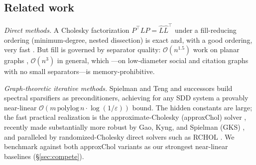 \documentclass[leqno,letterpaper]{etna}
\begin{document}
\subsection{Related work}\label{sec:related}
\emph{Direct methods.} A Cholesky factorization $P^{\top}LP=\hat L\hat L^{\top}$ under a
fill-reducing ordering (minimum-degree, nested dissection) is exact and, with a good
ordering, very fast \cite{davis-cholmod,george-nd}. But fill is governed by separator
quality: $\mathcal{O}(n^{1.5})$ work on planar graphs \cite{lipton-rose-tarjan},
$\mathcal{O}(n^3)$ in general, which ---on low-diameter social and citation graphs with no
small separators---is memory-prohibitive.

\emph{Graph-theoretic iterative methods.} Spielman and Teng \cite{spielman-teng} and
successors \cite{kelner-stoc} build spectral sparsifiers as preconditioners, achieving
for any SDD system a provably near-linear $\mathcal{O}(m\,\mathrm{polylog}\,n\cdot\log(1/\varepsilon))$ bound. The hidden constants are large; the fast practical realization is the
approximate-Cholesky (approxChol) solver \cite{kelner-stoc,laplacians}, recently made
substantially more robust by Gao, Kyng, and Spielman (GKS) \cite{gks2023}, and paralleled by randomized-Cholesky direct
solvers such as RCHOL \cite{rchol}. We benchmark against both approxChol variants as
our strongest near-linear baselines (\S\ref{sec:compete}).
\end{document}
